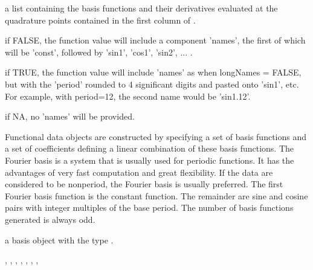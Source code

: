 \begin{Arguments}
\begin{ldescription}
\item[\code{values}] a list containing the basis functions and their derivatives
evaluated at the quadrature points contained in the first
column of .

\item[\code{longNames}] if FALSE, the function value will include a component 'names', the
first of which will be 'const', followed by 'sin1', 'cos1', 'sin2',
... . 

if TRUE, the function value will include 'names' as when longNames =
FALSE, but with the 'period' rounded to 4 significant digits and
pasted onto 'sin1', etc.  For example, with period=12, the second
name would be 'sin1.12'.

if NA, no 'names' will be provided.      

\end{ldescription}
\end{Arguments}
\begin{Details}\relax
Functional data objects are constructed by specifying a set of basis
functions and a set of coefficients defining a linear combination of
these basis functions.  The Fourier basis is a system
that is usually used for periodic functions.  It has the advantages
of very fast computation and great flexibility.   If the data are
considered to be nonperiod, the Fourier basis is usually preferred.
The first Fourier basis function is the constant function.  The
remainder are sine and cosine pairs with integer multiples of the
base period. The number of basis functions generated is always odd.
\end{Details}
\begin{Value}
a basis object with the type .
\end{Value}
\begin{SeeAlso}\relax
{}, 
, 
, 
, 
, 
, 
, 
\end{SeeAlso}
